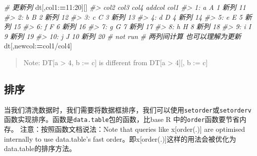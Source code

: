 \documentclass[
]{book}
\newenvironment{Shaded}{\begin{snugshade}}{\end{snugshade}}
\newcommand{\CommentTok}[1]{\textcolor[rgb]{0.56,0.35,0.01}{\textit{#1}}}
\newcommand{\DecValTok}[1]{\textcolor[rgb]{0.00,0.00,0.81}{#1}}
\newcommand{\ErrorTok}[1]{\textcolor[rgb]{0.64,0.00,0.00}{\textbf{#1}}}
\newcommand{\NormalTok}[1]{#1}
\newcommand{\SpecialCharTok}[1]{\textcolor[rgb]{0.00,0.00,0.00}{#1}}
\begin{document}
\begin{Shaded}
\begin{Highlighting}[]
\CommentTok{\# 更新列}
\NormalTok{dt[,col1}\SpecialCharTok{:}\ErrorTok{=}\DecValTok{11}\SpecialCharTok{:}\DecValTok{20}\NormalTok{][]}
\CommentTok{\#\textgreater{}     col2 col3 col4 addcol col1}
\CommentTok{\#\textgreater{}  1:    a    A    1   新列   11}
\CommentTok{\#\textgreater{}  2:    b    B    2   新列   12}
\CommentTok{\#\textgreater{}  3:    c    C    3   新列   13}
\CommentTok{\#\textgreater{}  4:    d    D    4   新列   14}
\CommentTok{\#\textgreater{}  5:    e    E    5   新列   15}
\CommentTok{\#\textgreater{}  6:    f    F    6   新列   16}
\CommentTok{\#\textgreater{}  7:    g    G    7   新列   17}
\CommentTok{\#\textgreater{}  8:    h    H    8   新列   18}
\CommentTok{\#\textgreater{}  9:    i    I    9   新列   19}
\CommentTok{\#\textgreater{} 10:    j    J   10   新列   20}
\CommentTok{\# not run }
\CommentTok{\# 两列间计算 也可以理解为更新}
\NormalTok{dt[,newcol}\SpecialCharTok{:}\ErrorTok{=}\NormalTok{col1}\SpecialCharTok{/}\NormalTok{col4]}
\end{Highlighting}
\end{Shaded}

\begin{quote}
Note: DT{[}a \textgreater{} 4, b := c{]} is different from DT{[}a \textgreater{} 4{]}{[}, b := c{]}
\end{quote}

\hypertarget{ux6392ux5e8f}{%
\subsection{排序}\label{ux6392ux5e8f}}

当我们清洗数据时，我们需要将数据框排序，我们可以使用\texttt{setorder}或\texttt{setorderv}函数实现排序。函数是\texttt{data.table}包的函数，比base R 中的\texttt{order}函数要节省内存。
注意：按照函数文档说法：Note that queries like x{[}order(.){]} are optimised internally to use data.table's fast order。即x{[}order(.){]}这样的用法会被优化为data.table的排序方法。
\end{document}
